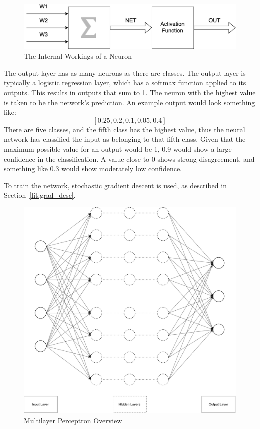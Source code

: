 \begin{figure}[!h]
	
	\centering
	\includegraphics[width=\textwidth]{figures/multilayer_perceptron_neuron2}
	\centering
	\caption{The Internal Workings of a Neuron}
	\label{fig:multi_neuron_close}
\end{figure}
 
 
 The output layer has as many neurons as there are classes. The output layer is typically a logistic regression layer, which has a softmax function applied to its outputs. This results in outputs that sum to 1. The neuron with the highest value is taken to be the network's prediction. An example output would look something like:
 \[ [0.25, 0.2, 0.1, 0.05, 0.4] \] There are five classes, and the fifth class has the highest value, thus the neural network has classified the input as belonging to that fifth class. Given that the maximum possible value for an output would be 1, 0.9 would show a large confidence in the classification. A value close to 0 shows strong disagreement, and something like 0.3 would show moderately low confidence.
 
 To train the network, stochastic gradient descent is used, as described in Section~\ref{lit:grad_desc}. 

\begin{figure}[!h]
	
	\centering
	\includegraphics[width=\textwidth]{figures/multilayer_perceptron}
	\centering
	\caption{Multilayer Perceptron Overview}
	\label{fig:multi}
\end{figure}


